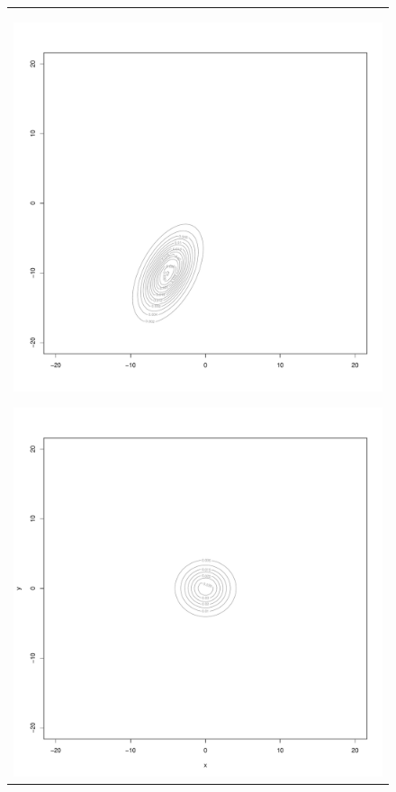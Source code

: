 \documentclass{jsarticle}
\begin{document}
\begin{figure}[b]
	\centering
	\begin{minipage}{0.8\hsize}
		\centering
		\begin{tabular}{c}
			\begin{minipage}{0.25\hsize}
				\centering
				\includegraphics[width=\linewidth]{img/mvrnorm-density1.pdf}
				\subcaption{第1項の正規分布}
				\label{img:mvrnorm-density1}
			\end{minipage}
			\begin{minipage}{0.25\hsize}
				\centering
				\includegraphics[width=\linewidth]{img/mvrnorm-density2.pdf}

\end{minipage}
\end{tabular}
\end{minipage}
\end{figure}
\end{document}
